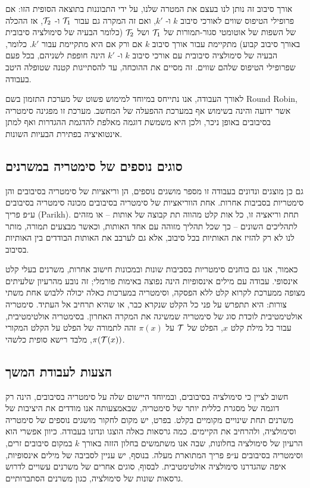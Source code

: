 {אורך סיבוב זה נותן לנו בעצם את המטרה שלנו, על ידי התבוננות בתוצאה הסופית הזו: אם פרופילי הטיפוס שווים לאורכי סיבוב
$k$
ו-
$k'$,
 ואם זה המקרה גם עבור
$\mathcal{T}_1$
ו-
$\mathcal{T}_2$,
אז ההכלה של השפות של אוטומטי סגור-תמורות של
$\mathcal{T}_1$
ושל
$\mathcal{T}_2$
(כלומר הבעיה של סימולציה סיבובית באורך סיבוב קבוע) מתקיימת עבור אורך סיבוב
$k$
אם ורק אם היא מתקיימת עבור
$k'$.
 כלומר, הבעיה של סימולציה סיבובית עם אורכי סיבוב
$k$
ו-
$k'$
הינה חופפת לשניהם, בכל פעם שפרופילי הטיפוס שלהם שווים. זה מסיים את ההוכחה, עד להסתייגות קטנה שטופלה היטב בעבודה.

לאורך העבודה, אנו נתייחס במיוחד למימוש פשוט של מערכת התזמון בשם 
\textenglish{Round Robin},
אשר ידועה והינה בשימוש אף במערכת ההפעלה של המחשב. מערכת זו מפגינה סימטריה בסיבובים באופן ניכר, ולכן היא משמשת דוגמה מאלפת להדגמת ההגדרות ואף למתן אינטואיציה בפתירת הבעיות השונות.

\subsection*{\texthebrew{סוגים נוספים של סימטריה במשרנים}}

גם כן מוצגים ונדונים בעבודה זו מספר מושגים נוספים, הן וריאציות של סימטריה בסיבובים והן סימטריות בסביבות אחרות. אחת הווריאציות של סימטריה בסיבובים מכונה סימטריה בסיבובים ע״פ פריך 
(\textenglish{Parikh}).
תחת וריאציה זו, כל אות קלט מהווה תת קבוצה של אותות – או מזהים לתהליכים השונים – כך שכל תהליך מזוהה עם אחד האותות, וכאשר מבצעים תמורה, מותר לנו לא רק להזיז את האותיות בכל סיבוב, אלא גם לערבב את האותות הבודדים בין האותיות בסיבוב.

כאמור, אנו גם בוחנים סימטריות בסביבות שונות ובמכונות חישוב אחרות, משרנים בעלי קלט אינסופי. עבודה עם מילים אינסופיות הינה נפוצה באימות פורמלי; זה נובע מהרעיון שלעיתים מצופה ממערכת לקרוא קלט ללא הפסקה, וסימטריה במערכות כאלה יכולה ללבוש אחת משתי צורות: היא תתפרש על פני כל הקלט שנקרא כבר, או שהיא תרחיב אל העתיד. סימטריה אולטימטיבית לוכדת סוג של סימטריה שמשיגה את המקרה האחרון. בסימטריה אולטימטיבית, עבור כל מילת קלט
$x$,
הפלט של
$\mathcal{T}$
על
$\pi(x)$
זהה לתמורה של הפלט על הקלט המקורי
$\pi(\mathcal{T}(x))$,
מלבד רישא סופית כלשהי.

\subsection*{\texthebrew{הצעות לעבודת המשך}}

חשוב לציין כי סימולציה בסיבובים, ובמיוחד היישום שלה על סימטריה בסיבובים, הינה רק דוגמה של מסגרת כללית יותר של סימטריה, שבאמצעותה אנו מודדים את היציבות של משרנים תחת שינויים מקומיים בקלט.
בפרט,
יש מקום לחקור מושגים נוספים של סימטריה וסימולציה,
ולהרחיב את הקיימים. 
כמה גרסאות כאלה הוצגו ונדונו בעבודה.
כיוון אפשרי הוא הרעיון של סימולציה בחלונות, שבה אנו משתמשים בחלון הזזה באורך
$k$
במקום סיבובים זרים, וסימטריה בסיבובים ע״פ פריך המתוארת מעלה. בנוסף, יש עניין לסביבה של מילים אינסופיות, איפה שהגדרנו סימולציה אולטימטיבית. לבסוף, סוגים אחרים של משרנים עשויים לדרוש גרסאות שונות של סימולציה, כגון משרנים הסתברותיים. 

}
